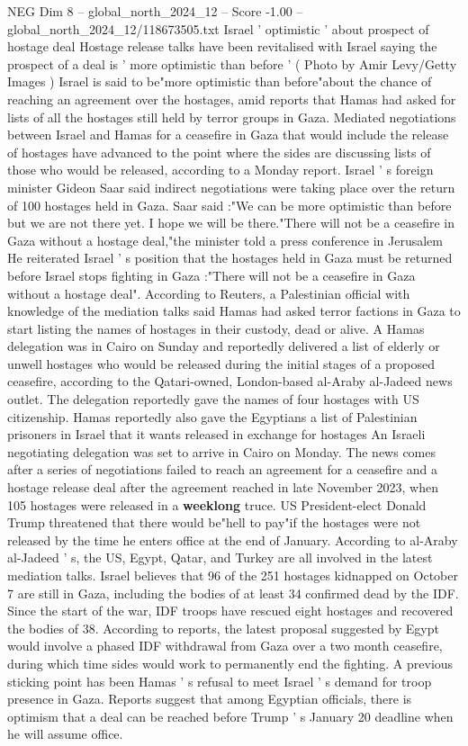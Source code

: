 \begin{textsample}{NEG Dim 8 – global\_north\_2024\_12 – Score -1.00 – global\_north\_2024\_12/118673505.txt}  \label{ex:f8_neg_357}
Israel ' optimistic ' about prospect of hostage deal Hostage release talks have been revitalised with Israel saying the prospect of a deal is ' more optimistic than before ' ( Photo by Amir Levy/Getty Images ) Israel is said to be"more optimistic than before"about the chance of reaching an agreement over the hostages, amid reports that Hamas had asked for lists of all the hostages still held by terror groups in Gaza.
Mediated negotiations between Israel and Hamas for a ceasefire in Gaza that would include the release of hostages have advanced to the point where the sides are discussing lists of those who would be released, according to a Monday report.
Israel ' s foreign minister Gideon Saar said indirect negotiations were taking place over the return of 100 hostages held in Gaza.
Saar said :"We can be more optimistic than before but we are not there yet.
I hope we will be there."There will not be a ceasefire in Gaza without a hostage deal,"the minister told a press conference in Jerusalem He reiterated Israel ' s position that the hostages held in Gaza must be returned before Israel stops fighting in Gaza :"There will not be a ceasefire in Gaza without a hostage deal".
According to Reuters, a Palestinian official with knowledge of the mediation talks said Hamas had asked terror factions in Gaza to start listing the names of hostages in their custody, dead or alive.
A Hamas delegation was in Cairo on Sunday and reportedly delivered a list of elderly or unwell hostages who would be released during the initial stages of a proposed ceasefire, according to the Qatari-owned, London-based al-Araby al-Jadeed news outlet.
The delegation reportedly gave the names of four hostages with US citizenship.
Hamas reportedly also gave the Egyptians a list of Palestinian prisoners in Israel that it wants released in exchange for hostages An Israeli negotiating delegation was set to arrive in Cairo on Monday.
The news comes after a series of negotiations failed to reach an agreement for a ceasefire and a hostage release deal after the agreement reached in late November 2023, when 105 hostages were released in a \textbf{weeklong} truce.
US President-elect Donald Trump threatened that there would be"hell to pay"if the hostages were not released by the time he enters office at the end of January.
According to al-Araby al-Jadeed ' s, the US, Egypt, Qatar, and Turkey are all involved in the latest mediation talks.
Israel believes that 96 of the 251 hostages kidnapped on October 7 are still in Gaza, including the bodies of at least 34 confirmed dead by the IDF.
Since the start of the war, IDF troops have rescued eight hostages and recovered the bodies of 38.
According to reports, the latest proposal suggested by Egypt would involve a phased IDF withdrawal from Gaza over a two month ceasefire, during which time sides would work to permanently end the fighting.
A previous sticking point has been Hamas ' s refusal to meet Israel ' s demand for troop presence in Gaza.
Reports suggest that among Egyptian officials, there is optimism that a deal can be reached before Trump ' s January 20 deadline when he will assume office.

\end{textsample}
